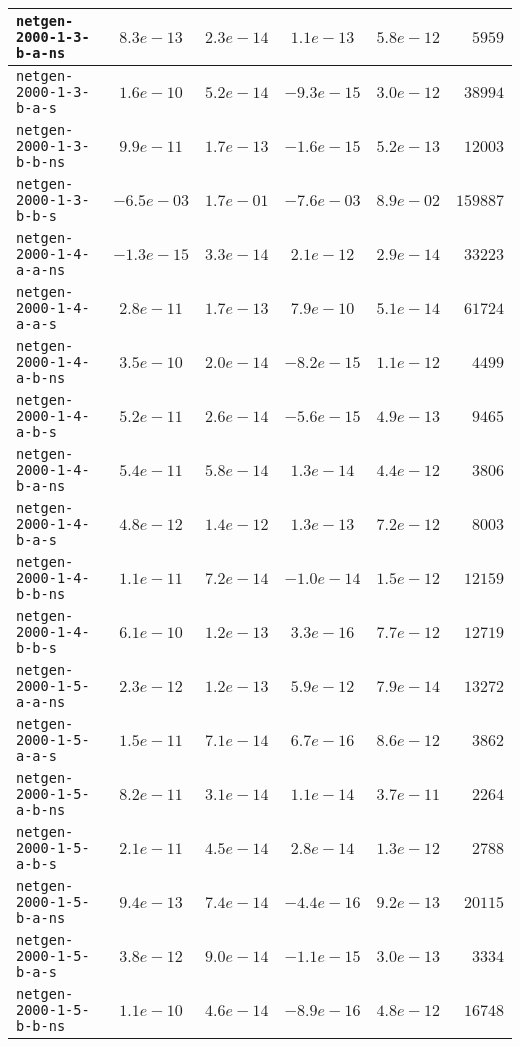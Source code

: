 \begin{center}
\begin{longtable}{|l || c | c | c | c | r|}
\hline
\texttt{netgen-2000-1-3-b-a-ns} & $8.3e-13$ & $2.3e-14$ & $1.1e-13$ & $5.8e-12$ & $5959$ \\
\hline
\texttt{netgen-2000-1-3-b-a-s} & $1.6e-10$ & $5.2e-14$ & $-9.3e-15$ & $3.0e-12$ & $38994$ \\
\hline
\texttt{netgen-2000-1-3-b-b-ns} & $9.9e-11$ & $1.7e-13$ & $-1.6e-15$ & $5.2e-13$ & $12003$ \\
\hline
\texttt{netgen-2000-1-3-b-b-s} & $-6.5e-03$ & $1.7e-01$ & $-7.6e-03$ & $8.9e-02$ & $159887$ \\
\hline
\texttt{netgen-2000-1-4-a-a-ns} & $-1.3e-15$ & $3.3e-14$ & $2.1e-12$ & $2.9e-14$ & $33223$ \\
\hline
\texttt{netgen-2000-1-4-a-a-s} & $2.8e-11$ & $1.7e-13$ & $7.9e-10$ & $5.1e-14$ & $61724$ \\
\hline
\texttt{netgen-2000-1-4-a-b-ns} & $3.5e-10$ & $2.0e-14$ & $-8.2e-15$ & $1.1e-12$ & $4499$ \\
\hline
\texttt{netgen-2000-1-4-a-b-s} & $5.2e-11$ & $2.6e-14$ & $-5.6e-15$ & $4.9e-13$ & $9465$ \\
\hline
\texttt{netgen-2000-1-4-b-a-ns} & $5.4e-11$ & $5.8e-14$ & $1.3e-14$ & $4.4e-12$ & $3806$ \\
\hline
\texttt{netgen-2000-1-4-b-a-s} & $4.8e-12$ & $1.4e-12$ & $1.3e-13$ & $7.2e-12$ & $8003$ \\
\hline
\texttt{netgen-2000-1-4-b-b-ns} & $1.1e-11$ & $7.2e-14$ & $-1.0e-14$ & $1.5e-12$ & $12159$ \\
\hline
\texttt{netgen-2000-1-4-b-b-s} & $6.1e-10$ & $1.2e-13$ & $3.3e-16$ & $7.7e-12$ & $12719$ \\
\hline
\texttt{netgen-2000-1-5-a-a-ns} & $2.3e-12$ & $1.2e-13$ & $5.9e-12$ & $7.9e-14$ & $13272$ \\
\hline
\texttt{netgen-2000-1-5-a-a-s} & $1.5e-11$ & $7.1e-14$ & $6.7e-16$ & $8.6e-12$ & $3862$ \\
\hline
\texttt{netgen-2000-1-5-a-b-ns} & $8.2e-11$ & $3.1e-14$ & $1.1e-14$ & $3.7e-11$ & $2264$ \\
\hline
\texttt{netgen-2000-1-5-a-b-s} & $2.1e-11$ & $4.5e-14$ & $2.8e-14$ & $1.3e-12$ & $2788$ \\
\hline
\texttt{netgen-2000-1-5-b-a-ns} & $9.4e-13$ & $7.4e-14$ & $-4.4e-16$ & $9.2e-13$ & $20115$ \\
\hline
\texttt{netgen-2000-1-5-b-a-s} & $3.8e-12$ & $9.0e-14$ & $-1.1e-15$ & $3.0e-13$ & $3334$ \\
\hline
\texttt{netgen-2000-1-5-b-b-ns} & $1.1e-10$ & $4.6e-14$ & $-8.9e-16$ & $4.8e-12$ & $16748$ \\

\end{longtable}
\end{center}
